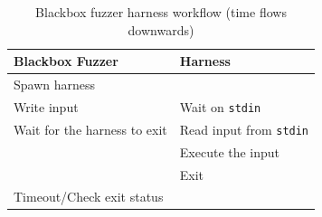 \documentclass[letterpaper,11pt]{article}
\begin{document}





\begin{table}[ht]
\centering
\caption{Blackbox fuzzer harness workflow (time flows downwards)}
\label{tab:blackboxfuzzerharness}
\begin{tabular}{ll}
\toprule
\textbf{Blackbox Fuzzer}          & \textbf{Harness}       \\ \midrule
Spawn harness            &      \\
Write input               &  Wait on \texttt{stdin}    \\
Wait for the harness to exit          & Read input from \texttt{stdin}   \\
                    & Execute the input    \\
                     &  Exit                    \\
Timeout/Check exit status                      &                     \\
\bottomrule

\end{tabular}
\end{table}
\end{document}
